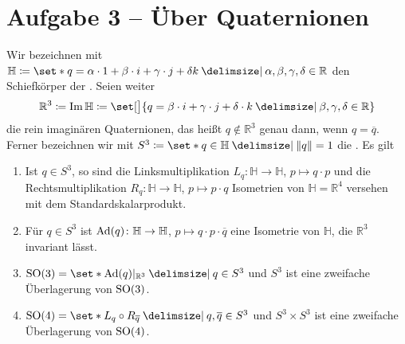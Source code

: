 \section{Aufgabe 3 -- Über Quaternionen} %
\label{sec:aufg3}
Wir bezeichnen mit $\mathbb{H} \coloneqq \set*{q = \alpha \cdot 1 + \beta \cdot i + \gamma \cdot j + \delta k \given \alpha, \beta, \gamma, \delta \in \mathbb{R}}$ den Schiefkörper der .
Seien weiter
\[
	\mathbb{R}^3 \coloneqq \Im \mathbb{H} \coloneqq \set[\big]{q = \beta \cdot i + \gamma \cdot j + \delta \cdot k \given \beta,\gamma,\delta \in \mathbb{R}}
\]
die rein imaginären Quaternionen, das heißt $q \notin \mathbb{R}^3$ genau dann, wenn $q = \overline{q}$.
Ferner bezeichnen wir mit $S^3 \coloneqq \set*{q \in \mathbb{H} \given \norm*{q}=1}$ die .
Es gilt
\begin{enumerate}[(1)]
	\item Ist $q \in S^3$, so sind die Linksmultiplikation $L_q \colon \mathbb{H} \to \mathbb{H}$, $p \mapsto q \cdot p$ und die Rechtsmultiplikation $R_q \colon \mathbb{H} \to \mathbb{H}$, $p \mapsto p \cdot q$ Isometrien von $\mathbb{H}=\mathbb{R}^4$ versehen mit dem Standardskalarprodukt.
	\item Für $q \in S^3$ ist $\operatorname{Ad}(q) \colon \mathbb{H} \to \mathbb{H}$, $p \mapsto q \cdot p \cdot \overline{q}$ eine Isometrie von $\mathbb{H}$, die $\mathbb{R}^3$ invariant lässt.
	\item $\SO(3) = \set*{\Ad(q)|_{\mathbb{R}^3} \given q \in S^3}$ und $S^3$ ist eine zweifache Überlagerung von $\operatorname{SO}(3)$.
	\item $\SO(4) = \set*{L_q \circ R_{\overline{q}} \given q,\overline{q} \in S^3}$ und $S^3 \times S^3$ ist eine zweifache Überlagerung von $\operatorname{SO}(4)$.
\end{enumerate}
\begin{beweis}
\end{beweis}

